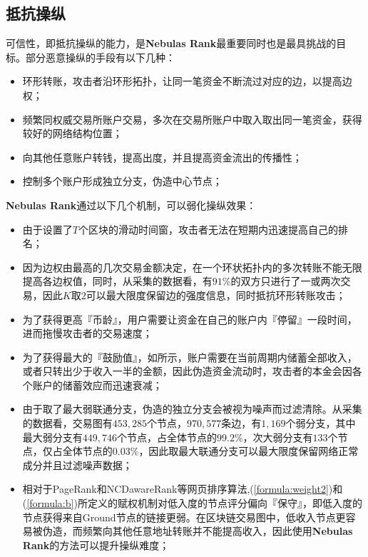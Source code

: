 \subsection{抵抗操纵}\label{subsec:robust}

可信性，即抵抗操纵的能力，是\textbf{Nebulas Rank}最重要同时也是最具挑战的目标。部分恶意操纵的手段有以下几种：
\begin{itemize}
	\item 环形转账，攻击者沿环形拓扑，让同一笔资金不断流过对应的边，以提高边权；
	\item 频繁同权威交易所账户交易，多次在交易所账户中取入取出同一笔资金，获得较好的网络结构位置；
	\item 向其他任意账户转钱，提高出度，并且提高资金流出的传播性；
	\item 控制多个账户形成独立分支，伪造中心节点；
\end{itemize}

\textbf{Nebulas Rank}通过以下几个机制，可以弱化操纵效果：
\begin{itemize}
	\item 由于设置了$T$个区块的滑动时间窗，攻击者无法在短期内迅速提高自己的排名；
	\item 因为边权由最高的几次交易金额决定，在一个环状拓扑内的多次转账不能无限提高各边权值，同时，从采集的数据看，有$91\%$的双方只进行了一或两次交易，因此$K$取$2$可以最大限度保留边的强度信息，同时抵抗环形转账攻击；
	\item 为了获得更高『币龄』，用户需要让资金在自己的账户内『停留』一段时间，进而拖慢攻击者的交易速度；
	\item 为了获得最大的『鼓励值』，如所示，账户需要在当前周期内储蓄全部收入，或者只转出少于收入一半的金额，因此伪造资金流动时，攻击者的本金会因各个账户的储蓄效应而迅速衰减；
	\item 由于取了最大弱联通分支，伪造的独立分支会被视为噪声而过滤清除。从采集的数据看，交易图有$453,285$个节点，$970,577$条边，有$1,169$个弱分支，其中最大弱分支有$449,746$个节点，占全体节点的$99.2\%$，次大弱分支有$133$个节点，仅占全体节点的$0.03\%$，因此取最大联通分支可以最大限度保留网络正常成分并且过滤噪声数据；
	\item 相对于PageRank和NCDawareRank\cite{Nikolakopoulos2013}等网页排序算法,(\ref{formula:weight2})和(\ref{formula:b})所定义的赋权机制对低入度的节点评分偏向『保守』，即低入度的节点获得来自Ground节点的链接更弱。在区块链交易图中，低收入节点更容易被伪造，而频繁向其他任意地址转账并不能提高收入，因此使用\textbf{Nebulas Rank}的方法可以提升操纵难度；
\end{itemize}

